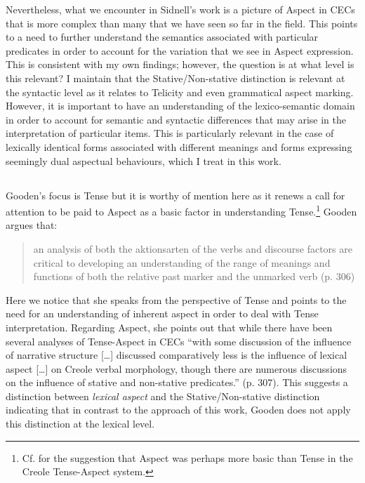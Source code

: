 Nevertheless, what we encounter in Sidnell’s work is a picture of
Aspect in CECs that is more complex than many that we have seen so far
in the field.  This points to a need to further understand the
semantics associated with particular predicates in order to account
for the variation that we see in Aspect expression.  This is
consistent with my own findings; however, the question is at what
level is this relevant?  I maintain that the Stative\slash Non-stative
distinction is relevant at the syntactic level as it relates to
Telicity and even grammatical aspect marking.  However, it is
important to have an understanding of the lexico-semantic domain in
order to account for semantic and syntactic differences that may arise
in the interpretation of particular items.  This is particularly
relevant in the case of lexically identical forms associated with
different meanings and forms expressing seemingly dual aspectual
behaviours, which I treat in this work.

\subsection{\citet{Gooden2008}}\label{sec:2.1.8}

Gooden’s focus is Tense but it is worthy of mention here as it renews
a call for attention to be paid to Aspect as a basic factor in
understanding Tense.\footnote{Cf. \citet{Alleyne1980} for the suggestion 
that Aspect was perhaps more basic than Tense in the Creole
  Tense-Aspect system.} Gooden argues that:

\begin{quote}
an analysis of both the aktionsarten of the verbs and discourse
factors are critical to developing an understanding of the range of
meanings and functions of both the relative past marker and the
unmarked verb (p. 306)
\end{quote}

Here we notice that she speaks from the perspective of Tense and
points to the need for an understanding of inherent aspect in order to
deal with Tense interpretation.  Regarding Aspect, she points out that
while there have been several analyses of Tense-Aspect in CECs “with
some discussion of the influence of narrative structure […] discussed
comparatively less is the influence of lexical aspect […] on Creole
verbal morphology, though there are numerous discussions on the
influence of stative and non-stative predicates.” (p. 307).  This
suggests a distinction between \textit{lexical aspect} and the
Stative\slash Non-stative distinction indicating that in contrast to the
approach of this work, Gooden does not apply this distinction at the
lexical level.

